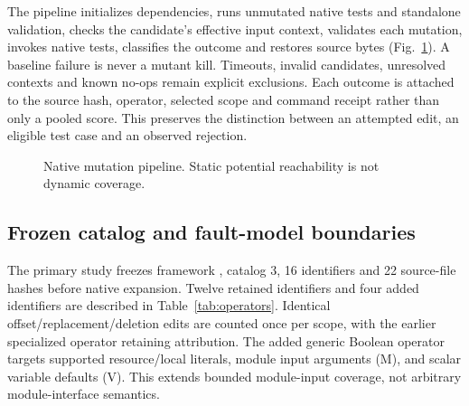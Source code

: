 The pipeline initializes dependencies, runs unmutated native tests and standalone validation, checks the candidate's effective input context, validates each mutation, invokes native tests, classifies the outcome and restores source bytes (Fig.~\ref{fig:pipeline}). A baseline failure is never a mutant kill. Timeouts, invalid candidates, unresolved contexts and known no-ops remain explicit exclusions. Each outcome is attached to the source hash, operator, selected scope and command receipt rather than only a pooled score. This preserves the distinction between an attempted edit, an eligible test case and an observed rejection.

\begin{figure}[ht]
\centering
{}
\caption{Native mutation pipeline. Static potential reachability is not dynamic coverage.}\label{fig:pipeline}
\end{figure}

\subsection{Frozen catalog and fault-model boundaries}\label{sec:operators}
The primary study freezes framework , catalog 3, 16 identifiers and 22 source-file hashes before native expansion. Twelve retained identifiers and four added identifiers are described in Table~\ref{tab:operators}. Identical offset/replacement/deletion edits are counted once per scope, with the earlier specialized operator retaining attribution. The added generic Boolean operator targets supported resource/local literals, module input arguments (M), and scalar variable defaults (V). This extends bounded module-input coverage, not arbitrary module-interface semantics.

